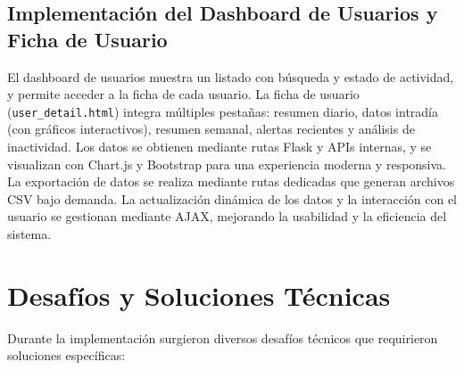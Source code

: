\subsection{Implementación del Dashboard de Usuarios y Ficha de Usuario}
El dashboard de usuarios muestra un listado con búsqueda y estado de actividad, y permite acceder a la ficha de cada usuario. La ficha de usuario (\texttt{user\_detail.html}) integra múltiples pestañas: resumen diario, datos intradía (con gráficos interactivos), resumen semanal, alertas recientes y análisis de inactividad. Los datos se obtienen mediante rutas Flask y APIs internas, y se visualizan con Chart.js y Bootstrap para una experiencia moderna y responsiva. La exportación de datos se realiza mediante rutas dedicadas que generan archivos CSV bajo demanda. La actualización dinámica de los datos y la interacción con el usuario se gestionan mediante AJAX, mejorando la usabilidad y la eficiencia del sistema.

\section{Desafíos y Soluciones Técnicas}
\label{sec:impl_desafios}

Durante la implementación surgieron diversos desafíos técnicos que requirieron soluciones específicas:

